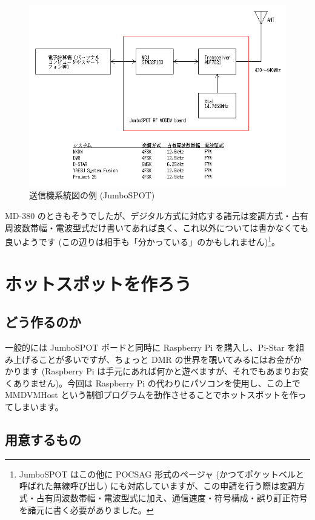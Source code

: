 \documentclass[a4j,oneside]{ujbook}
\begin{document}
\begin{figure}[H]
 \centering
 \includegraphics[width=15cm]{img/mmdvm-nopocsag.png}
 \caption{送信機系統図の例 (JumboSPOT)}
\end{figure}

MD-380 のときもそうでしたが、デジタル方式に対応する諸元は変調方式・占有周波数帯幅・電波型式だけ書いてあれば良く、これ以外については書かなくても良いようです (この辺りは相手も「分かっている」のかもしれません)\footnote{JumboSPOT はこの他に POCSAG 形式のページャ (かつてポケットベルと呼ばれた無線呼び出し) にも対応していますが、この申請を行う際は変調方式・占有周波数帯幅・電波型式に加え、通信速度・符号構成・誤り訂正符号を諸元に書く必要がありました。}。

\chapter{ホットスポットを作ろう}

\section{どう作るのか}

一般的には JumboSPOT ボードと同時に Raspberry Pi を購入し、Pi-Star を組み上げることが多いですが、ちょっと DMR の世界を覗いてみるにはお金がかかります (Raspberry Pi は手元にあれば何かと遊べますが、それでもあまりお安くありません)。今回は Raspberry Pi の代わりにパソコンを使用し、この上で MMDVMHost という制御プログラムを動作させることでホットスポットを作ってしまいます。

\section{用意するもの}
\end{document}

